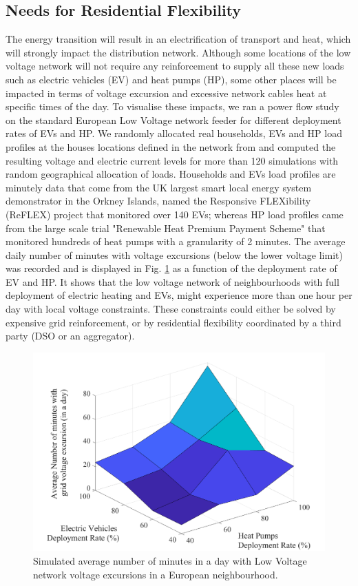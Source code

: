 \documentclass[conference]{IEEEtran}
\begin{document}
\subsection{Needs for Residential Flexibility}
The energy transition will  result in an electrification of transport and heat, which will strongly impact the distribution network. Although some locations of the low voltage network will not require any reinforcement to supply all these new loads such as electric vehicles (EV) and heat pumps (HP), some other places will be impacted in terms of voltage excursion and excessive network cables heat at specific times of the day. To visualise these impacts, we ran a power flow study on the standard European Low Voltage network feeder \cite{IEEE:PESTestFeeder} for different deployment rates of EVs and HP. We randomly allocated real households, EVs and HP load profiles at the houses locations defined in the network from \cite{IEEE:PESTestFeeder} and computed the resulting voltage and electric current levels for more than 120  simulations with random geographical allocation of loads. Households and EVs load profiles are minutely data that come from the UK  largest smart local energy system demonstrator in the Orkney Islands, named the Responsive FLEXibility (ReFLEX) project that monitored over 140 EVs; whereas HP load profiles came from the large scale trial "Renewable Heat Premium Payment Scheme" \cite{RHPP} that monitored hundreds of heat pumps with a granularity of 2 minutes. The average daily number of minutes with voltage excursions (below the lower voltage limit) was recorded and is displayed in Fig. \ref{Fig:voltage_excursion} as a function of the deployment rate of EV and HP. It shows that the low voltage network of neighbourhoods with full deployment of electric heating and EVs, might experience more than one hour per day with local voltage constraints. These constraints could either be solved by expensive grid reinforcement, or by residential flexibility coordinated by a third party (DSO or an aggregator). 

\begin{figure}[h]
	\centering
	\includegraphics[width=0.75\columnwidth]{Images/ReFELX_EV_HP_Impact_Map2.pdf}
	\caption{Simulated average number of minutes in a day with Low Voltage network voltage excursions in a European neighbourhood.}
	\label{Fig:voltage_excursion}
\end{figure}
\end{document}
